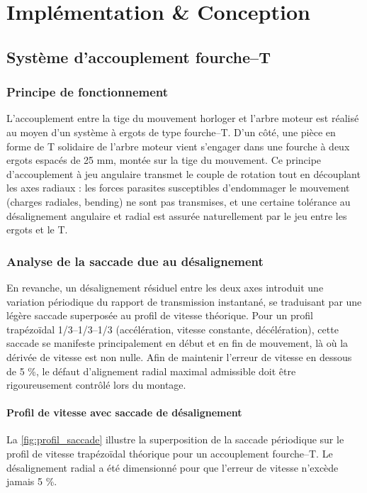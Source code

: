 \chapter{Implémentation \& Conception}

\section{Système d'accouplement fourche–T}

\subsection{Principe de fonctionnement}

L'accouplement entre la tige du mouvement horloger et l'arbre moteur est réalisé au moyen d'un système à ergots de type fourche–T. 
D'un côté, une pièce en forme de T solidaire de l'arbre moteur vient s'engager dans une fourche à deux ergots espacés de 25 mm, montée sur la tige du mouvement. 
Ce principe d'accouplement à jeu angulaire transmet le couple de rotation tout en découplant les axes radiaux : les forces parasites susceptibles d'endommager le mouvement (charges radiales, bending) ne sont pas transmises, et une certaine tolérance au désalignement angulaire et radial est assurée naturellement par le jeu entre les ergots et le T.

\subsection{Analyse de la saccade due au désalignement}

En revanche, un désalignement résiduel entre les deux axes introduit une variation périodique du rapport de transmission instantané, se traduisant par une légère saccade superposée au profil de vitesse théorique. 
Pour un profil trapézoïdal 1/3–1/3–1/3 (accélération, vitesse constante, décélération), cette saccade se manifeste principalement en début et en fin de mouvement, là où la dérivée de vitesse est non nulle. 
Afin de maintenir l'erreur de vitesse en dessous de 5 \%, le défaut d'alignement radial maximal admissible doit être rigoureusement contrôlé lors du montage.

\subsubsection{Profil de vitesse avec saccade de désalignement}

La \autoref{fig:profil_saccade} illustre la superposition de la saccade périodique sur le profil de vitesse trapézoïdal théorique pour un accouplement fourche–T. 
Le désalignement radial a été dimensionné pour que l'erreur de vitesse n'excède jamais 5 \%.

